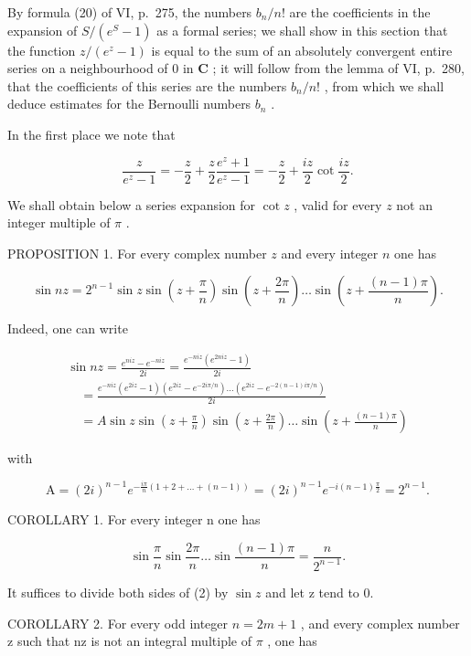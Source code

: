 By formula (20) of VI, p.~275, the numbers \(b_{n} / n!\) are the coefficients in the expansion of \(S / (e^{S} - 1)\) as a formal series; we shall show in this section that the function \(z / (e^{z} - 1)\) is equal to the sum of an absolutely convergent entire series on a neighbourhood of 0 in \(\mathbf{C}\) ; it will follow from the lemma of VI, p.~280, that the coefficients of this series are the numbers \(b_{n} / n!\) , from which we shall deduce estimates for the Bernoulli numbers \(b_{n}\) .

In the first place we note that

\[
{\frac {z}{e ^ {z} - 1}} = - {\frac {z}{2}} + {\frac {z}{2}} {\frac {e ^ {z} + 1}{e ^ {z} - 1}} = - {\frac {z}{2}} + {\frac {i z}{2}} \cot {\frac {i z}{2}}.\tag{1}
\]

We shall obtain below a series expansion for \(\cot z\) , valid for every \(z\) not an integer multiple of \(\pi\) .

PROPOSITION 1. For every complex number \(z\) and every integer \(n\) one has

\[
\sin n z = 2 ^ {n - 1} \sin z \sin \left(z + \frac {\pi}{n}\right) \sin \left(z + \frac {2 \pi}{n}\right) \dots \sin \left(z + \frac {(n - 1) \pi}{n}\right).\tag{2}
\]

Indeed, one can write

\[
\begin{array}{l} \sin n z = \frac {e ^ {n i z} - e ^ {- n i z}}{2 i} = \frac {e ^ {- n i z} (e ^ {2 n i z} - 1)}{2 i} \\ \quad = \frac {e ^ {- n i z} (e ^ {2 i z} - 1) (e ^ {2 i z} - e ^ {- 2 i \pi / n}) \dots (e ^ {2 i z} - e ^ {- 2 (n - 1) i \pi / n})}{2 i} \\ \quad = A \sin z \sin \left(z + \frac {\pi}{n}\right) \sin \left(z + \frac {2 \pi}{n}\right) \dots \sin \left(z + \frac {(n - 1) \pi}{n}\right) \end{array}
\]

with

\[
\mathrm{A} = (2 i) ^ {n - 1} e ^ {- \frac {i \pi}{n} (1 + 2 + \dots + (n - 1))} = (2 i) ^ {n - 1} e ^ {- i (n - 1) \frac {\pi}{2}} = 2 ^ {n - 1}.
\]

COROLLARY 1. For every integer n one has

\[
\sin \frac {\pi}{n} \sin \frac {2 \pi}{n} \dots \sin \frac {(n - 1) \pi}{n} = \frac {n}{2 ^ {n - 1}}.\tag{3}
\]

It suffices to divide both sides of (2) by \(\sin z\) and let z tend to 0.

COROLLARY 2. For every odd integer \(n = 2m + 1\) , and every complex number z such that nz is not an integral multiple of \(\pi\) , one has

